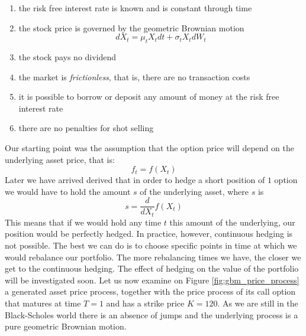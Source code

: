 \documentclass[times, utf8, diplomski]{fer}
\begin{document}
\begin{enumerate}[label=(\roman*)]
	\item the risk free interest rate is known and is constant through time
	\item the stock price is governed by the geometric Brownian motion $$dX_t = \mu_t X_t dt + \sigma_t X_t dW_t$$
	\item the stock pays no dividend
	\item the market is \textit{frictionless}, that is, there are no transaction costs
	\item it is possible to borrow or deposit any amount of money at the risk free interest rate
	\item there are no penalties for shot selling
\end{enumerate}
Our starting point was the assumption that the option price will depend on the underlying asset price, that is: $$f_t = f(X_t)$$ Later we have arrived derived that in order to hedge a short position of $1$ option we would have to hold the amount $s$ of the underlying asset, where $s$ is 
\begin{equation} \label{eqn:s_delta}
	s = \frac{d}{dX_t}f(X_t)
\end{equation}
This means that if we would hold any time $t$ this amount of the underlying, our position would be perfectly hedged. In practice, however, continuous hedging is not possible. The best we can do is to choose specific points in time at which we would rebalance our portfolio. The more rebalancing times we have, the closer we get to the continuous hedging. The effect of hedging on the value of the portfolio will be investigated soon. Let us now examine on Figure \ref{fig:gbm_price_process} a generated asset price process, together with the price process of its call option that matures at time $T=1$ and has a strike price $K=120$. As we are still in the Black-Scholes world there is an absence of jumps and the underlying process is a pure geometric Brownian motion.
\end{document}

